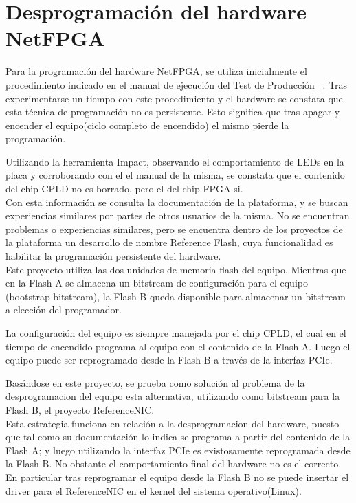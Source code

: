 \section{Desprogramaci\'on del hardware NetFPGA}
\label{apendiceB2}

Para la programación del hardware NetFPGA, se utiliza inicialmente el procedimiento indicado en el manual de ejecuci\'on del Test de Producci\'on ~\citep{ProdTestManual}. Tras experimentarse un tiempo con este procedimiento y el hardware se constata que esta técnica de programación no es persistente. Esto significa que tras apagar y encender el equipo(ciclo completo de encendido) el mismo pierde la programación. 

Utilizando la herramienta Impact, observando el comportamiento de LEDs en la placa y corroborando con el el manual de la misma, se constata que el contenido del chip CPLD no es borrado, pero el del chip FPGA si.\\

Con esta información se consulta la documentación de la plataforma, y se buscan experiencias similares por partes de otros usuarios de la misma. No se encuentran problemas o experiencias similares, pero se encuentra dentro de los proyectos de la plataforma un desarrollo de nombre Reference Flash, cuya funcionalidad es habilitar la programación persistente del hardware.\\

Este proyecto utiliza las dos unidades de memoria flash del equipo. Mientras que en la Flash A se almacena un bitstream de configuración para el equipo (bootstrap bitstream), la  Flash B queda disponible para almacenar un bitstream a elección del programador. 

La configuración del equipo es siempre manejada por el chip CPLD, el cual en el tiempo de encendido programa al equipo con el contenido de la Flash A. Luego el equipo puede ser reprogramado desde la Flash B a través de la interfaz PCIe.

Basándose en este proyecto, se prueba como solución al problema de la desprogramacion del equipo esta alternativa, utilizando como bitstream para la Flash B, el proyecto ReferenceNIC.\\

Esta estrategia funciona en relación a la desprogramacion del hardware, puesto que tal como su documentación lo indica se programa a partir del contenido de la Flash A; y luego utilizando la interfaz PCIe es existosamente reprogramada desde la Flash B. No obstante el comportamiento final del hardware no es el correcto. En particular tras reprogramar el equipo desde la Flash B no se puede insertar el driver para el ReferenceNIC en el kernel del sistema operativo(Linux).\\

